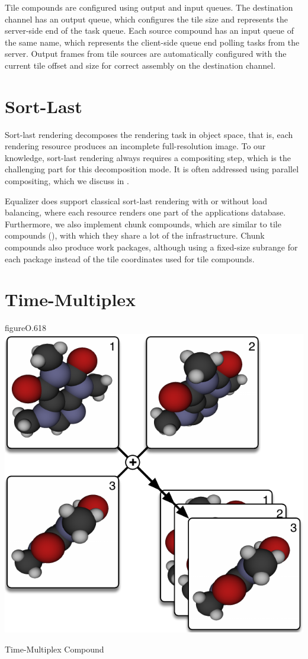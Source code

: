 Tile compounds are configured using output and input queues. The destination
channel has an output queue, which configures the tile size and represents the
server-side end of the task queue. Each source compound has an input queue of
the same name, which represents the client-side queue end polling tasks from
the server. Output frames from tile sources are automatically configured with
the current tile offset and size for correct assembly on the destination
channel.

\section{Sort-Last}

Sort-last rendering decomposes the rendering task in object space, that is,
each rendering resource produces an incomplete full-resolution image. To our
knowledge, sort-last rendering always requires a compositing step, which is the
challenging part for this decomposition mode. It is often addressed using
parallel compositing, which we discuss in .

Equalizer does support classical sort-last rendering with or without
load balancing, where each resource renders one part of the applications
database. Furthermore, we also implement chunk compounds, which are similar to
tile compounds (), with which they share a lot of the
infrastructure. Chunk compounds also produce work packages, although using a
fixed-size subrange for each package instead of the tile coordinates used for
tile compounds.

\section{Time-Multiplex}

\begin{wrapfloat}{figure}{O}{.618\textwidth}
\includegraphics[width=.618\textwidth]{images/DPlex}
{\caption{\label{fDPlex}Time-Multiplex Compound}}
\end{wrapfloat}

